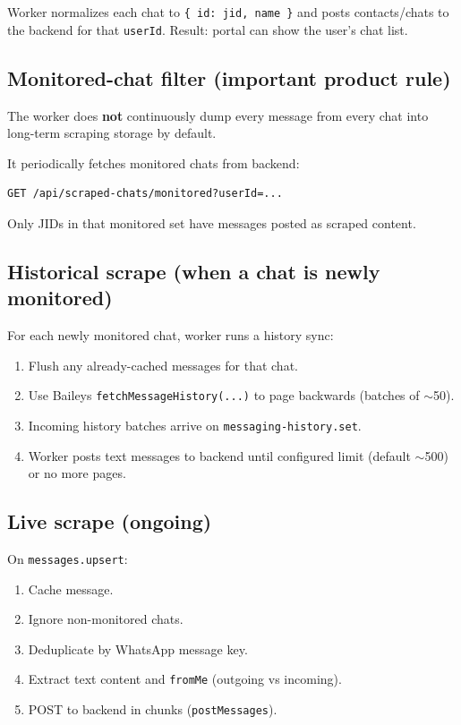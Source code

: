 \documentclass[11pt,a4paper]{article}
\begin{document}
Worker normalizes each chat to \texttt{\{ id: jid, name \}} and posts contacts/chats to the backend for that \texttt{userId}. Result: portal can show the user's chat list.

\subsection{Monitored-chat filter (important product rule)}

The worker does \textbf{not} continuously dump every message from every chat into long-term scraping storage by default.

It periodically fetches monitored chats from backend:

\begin{lstlisting}
GET /api/scraped-chats/monitored?userId=...
\end{lstlisting}

Only JIDs in that monitored set have messages posted as scraped content.

\subsection{Historical scrape (when a chat is newly monitored)}

For each newly monitored chat, worker runs a history sync:
\begin{enumerate}[leftmargin=1.4em]
  \item Flush any already-cached messages for that chat.
  \item Use Baileys \texttt{fetchMessageHistory(...)} to page backwards (batches of $\sim$50).
  \item Incoming history batches arrive on \texttt{messaging-history.set}.
  \item Worker posts text messages to backend until configured limit (default $\sim$500) or no more pages.
\end{enumerate}

\subsection{Live scrape (ongoing)}

On \texttt{messages.upsert}:
\begin{enumerate}[leftmargin=1.4em]
  \item Cache message.
  \item Ignore non-monitored chats.
  \item Deduplicate by WhatsApp message key.
  \item Extract text content and \texttt{fromMe} (outgoing vs incoming).
  \item POST to backend in chunks (\texttt{postMessages}).
\end{enumerate}
\end{document}
